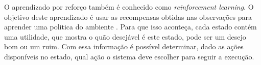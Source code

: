 

O aprendizado por reforço também é conhecido como \textit{reinforcement learning}. O objetivo deste aprendizado é usar as recompensas obtidas nas observações para aprender uma politica do ambiente \cite{intelligence2003modern}. Para que isso aconteça, cada estado contém uma utilidade, que mostra o quão desejável é este estado, pode ser um desejo bom ou um ruim. Com essa informação é possível determinar, dado as ações disponíveis no estado, qual ação o sistema deve escolher para seguir a execução. 





